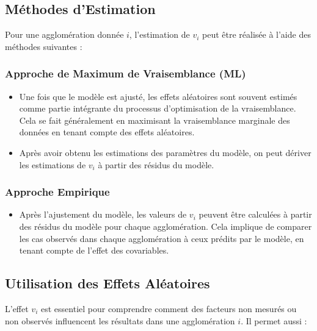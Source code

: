 \documentclass[
]{article}
\providecommand{\tightlist}{%
  \setlength{\itemsep}{0pt}\setlength{\parskip}{0pt}}
\begin{document}
\subsection{Méthodes d'Estimation}\label{muxe9thodes-destimation}

Pour une agglomération donnée \(i\), l'estimation de \(v_i\) peut être
réalisée à l'aide des méthodes suivantes :

\subsubsection{Approche de Maximum de Vraisemblance
(ML)}\label{approche-de-maximum-de-vraisemblance-ml}

\begin{itemize}
\item
  Une fois que le modèle est ajusté, les effets aléatoires sont souvent
  estimés comme partie intégrante du processus d'optimisation de la
  vraisemblance. Cela se fait généralement en maximisant la
  vraisemblance marginale des données en tenant compte des effets
  aléatoires.
\item
  Après avoir obtenu les estimations des paramètres du modèle, on peut
  dériver les estimations de \(v_i\) à partir des résidus du modèle.
\end{itemize}

\subsubsection{Approche Empirique}\label{approche-empirique}

\begin{itemize}
\tightlist
\item
  Après l'ajustement du modèle, les valeurs de \(v_i\) peuvent être
  calculées à partir des résidus du modèle pour chaque agglomération.
  Cela implique de comparer les cas observés dans chaque agglomération à
  ceux prédits par le modèle, en tenant compte de l'effet des
  covariables.
\end{itemize}

\subsection{Utilisation des Effets
Aléatoires}\label{utilisation-des-effets-aluxe9atoires}

L'effet \(v_i\) est essentiel pour comprendre comment des facteurs non
mesurés ou non observés influencent les résultats dans une agglomération
\(i\). Il permet aussi :
\end{document}
